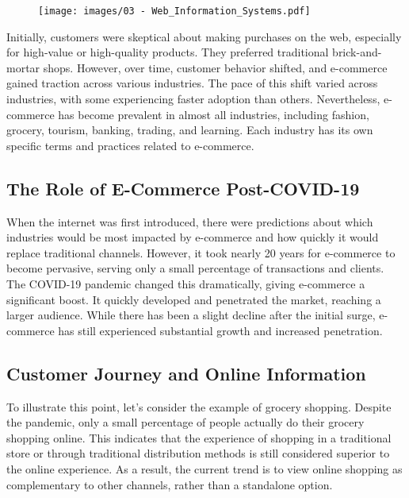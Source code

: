 \begin{figure}[!h]
  \centering
  \texttt{[image: images/03 - Web\_Information\_Systems.pdf]}
\end{figure}

Initially, customers were skeptical about making purchases on the web,
especially for high-value or high-quality products. They preferred
traditional brick-and-mortar shops. However, over time, customer
behavior shifted, and e-commerce gained traction across various
industries. The pace of this shift varied across industries, with some
experiencing faster adoption than others. Nevertheless, e-commerce has
become prevalent in almost all industries, including fashion, grocery,
tourism, banking, trading, and learning. Each industry has its own
specific terms and practices related to e-commerce.

\subsection{The Role of E-Commerce
  Post-COVID-19}\label{the-role-of-e-commerce-post-covid-19}

When the internet was first introduced, there were predictions about
which industries would be most impacted by e-commerce and how quickly it
would replace traditional channels. However, it took nearly 20 years for
e-commerce to become pervasive, serving only a small percentage of
transactions and clients. The COVID-19 pandemic changed this
dramatically, giving e-commerce a significant boost. It quickly
developed and penetrated the market, reaching a larger audience. While
there has been a slight decline after the initial surge, e-commerce has
still experienced substantial growth and increased penetration.

\subsection{Customer Journey and Online
  Information}\label{customer-journey-and-online-information}

To illustrate this point, let's consider the example of grocery
shopping. Despite the pandemic, only a small percentage of people
actually do their grocery shopping online. This indicates that the
experience of shopping in a traditional store or through traditional
distribution methods is still considered superior to the online
experience. As a result, the current trend is to view online shopping as
complementary to other channels, rather than a standalone option.

